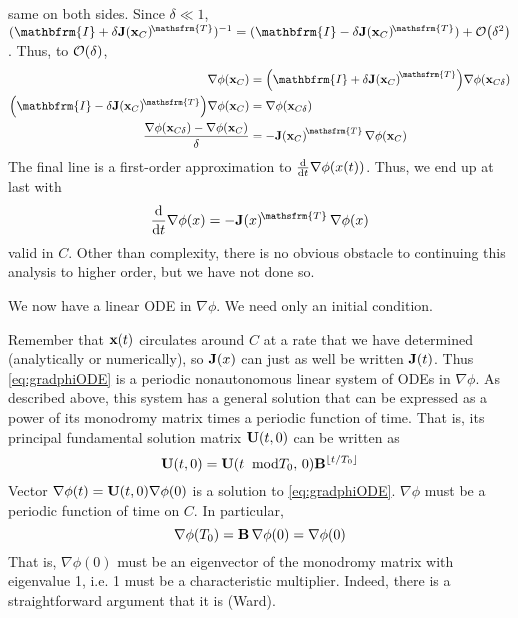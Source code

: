 \documentclass[10pt,letter, swedish, english,%
]{article}
\newcommand{\T}{{\!\mathsfrm{T}}}
\newcommand{\I}{{\mathbfrm{I}}}
\begin{document}
same on both sides. Since  $\delta\ll1$,  
$(\I+\delta\vb{J}(\vb{x}_{C})^{\T})^{-1}
=(\I-\delta\vb{J}(\vb{x}_{C})^{\T})+\order{\delta^2}$. 
Thus, to $\order{\delta}$,
\begin{equation}
\begin{aligned}
{\nabla}\phi(\vb{x}_{C})&=\qty(\I+\delta\vb{J}{(\vb{x}_{C})}^{\T})
{\nabla}\phi(\vb{x}_{C\delta})\\
\qty(\I-\delta \vb{J}(\vb{x}_{C})^{\T})
{\nabla}\phi(\vb{x}_{C})&={\nabla}\phi(\vb{x}_{C\delta})\\
\frac{{\nabla}\phi(\vb{x}_{C\delta})-{\nabla}\phi(\vb{x}_{C})}{\delta}
&=-\vb{J}{(\vb{x}_{C})}^{\T}\,{\nabla}\phi(\vb{x}_{C})
\end{aligned}
\end{equation}
The final line is a first-order approximation to 
$\dv{t} \nabla\phi(x(t))$. Thus, we end up at last with 
\begin{equation}\label{eq:gradphiODE}
\dv{t} \nabla\phi(x)
=-\vb{J}(x)^{\T}\,\nabla\phi(x)
\end{equation}
valid in  $C$. Other than complexity, there is no obvious obstacle to
continuing this analysis to higher order, but we have not done so. 

We now have a linear ODE in ${\nabla}\phi$. We need only an
initial condition. 

Remember that  $\vb{x}(t)$ circulates around  $C$ at a rate that we have
determined (analytically or numerically), so  $\vb{J}(x)$ can just as well
be written  $\vb{J}(t)$. Thus \eqref{eq:gradphiODE} is a periodic nonautonomous linear
system of ODEs in  ${\nabla}\phi$. As described above, this
system has a general solution that can be expressed as a power of its
monodromy matrix times a periodic function of time. That is, its
principal fundamental solution matrix  $\vb{U}(t,0)$ can be written as 
\begin{equation}
\vb{U}(t,0)=\vb{U}(t\;\;\text{mod}{T}_{0},\,0)\vb{B}^{\lfloor t/{T}_0\rfloor}
\end{equation}
Vector  ${\nabla}\phi(t)=\vb{U}(t, 0){\nabla}\phi(0)$ 
is a solution to \eqref{eq:gradphiODE}. ${\nabla}\phi$ must be a periodic function of
time on $C$. In particular, 
\begin{equation}
\nabla\phi(T_0)=\vb{B}\,\nabla\phi(0)={\nabla}\phi(0)
\end{equation}
That is,  ${\nabla}\phi(0)$ must be an eigenvector of
the monodromy matrix with eigenvalue 1, i.e. 1 must be a
characteristic multiplier. Indeed, there is a straightforward
argument that it is (Ward). 
\end{document}
